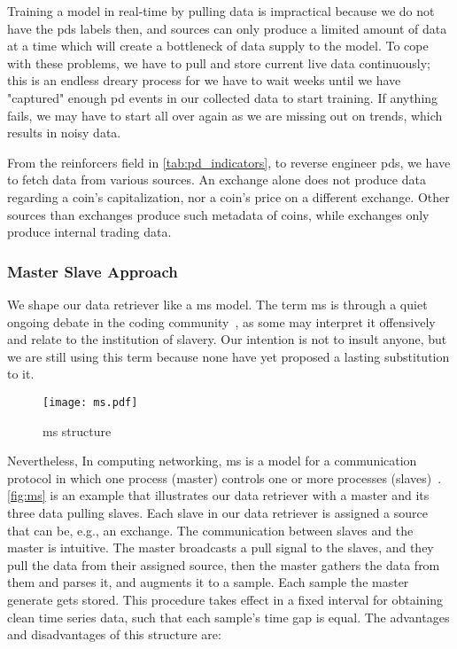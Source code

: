 Training a model in real-time by pulling data is impractical because we do not have the \acp{pd} labels then, and sources can only produce a limited amount of data at a time which will create a bottleneck of data supply to the model. To cope with these problems, we have to pull and store current live data continuously; this is an endless dreary process for we have to wait weeks until we have "captured" enough \ac{pd} events in our collected data to start training. If anything fails, we may have to start all over again as we are missing out on trends, which results in noisy data.

From the reinforcers field in \autoref{tab:pd_indicators}, to reverse engineer \acp{pd}, we have to fetch data from various sources. An exchange alone does not produce data regarding a coin's capitalization, nor a coin's price on a different exchange. Other sources than exchanges produce such metadata of coins, while exchanges only produce internal trading data.

\subsubsection{Master Slave Approach}
We shape our data retriever like a \ac{ms} model. The term \ac{ms} is through a quiet ongoing debate in the coding community~\cite{giz_master, reg_master, med_master}, as some may interpret it offensively and relate to the institution of slavery. Our intention is not to insult anyone, but we are still using this term because none have yet proposed a lasting substitution to it.

\begin{figure}[ht]
    \centering
    \texttt{[image: ms.pdf]}
    \caption{\acf{ms} structure}
    \label{fig:ms}
\end{figure}

Nevertheless, In computing networking, \ac{ms} is a model for a communication protocol in which one process (master) controls one or more processes (slaves)~\cite{ms_bs}. \autoref{fig:ms} is an example that illustrates our data retriever with a master and its three data pulling slaves. Each slave in our data retriever is assigned a source that can be, e.g., an exchange. The communication between slaves and the master is intuitive. The master broadcasts a pull signal to the slaves, and they pull the data from their assigned source, then the master gathers the data from them and parses it, and augments it to a sample. Each sample the master generate gets stored. This procedure takes effect in a fixed interval for obtaining clean time series data, such that each sample's time gap is equal. The advantages and disadvantages of this structure are:

